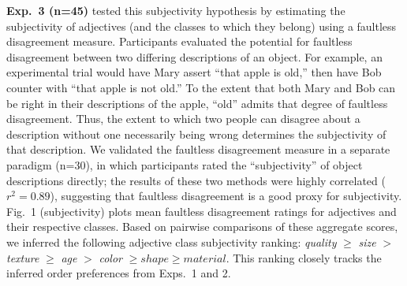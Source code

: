 \documentclass[12pt]{article}
\begin{document}
\textbf{Exp.~3 (n=45)} tested this subjectivity hypothesis  by estimating the subjectivity of adjectives (and the classes to which they belong) using a faultless disagreement measure. Participants evaluated the potential for faultless disagreement between two differing descriptions of an object. For example, an experimental trial would have Mary assert ``that apple is old,'' then have Bob counter with ``that apple is not old.'' 
To the extent that both Mary and Bob can be right in their descriptions of the apple, ``old'' admits that degree of faultless disagreement. 
Thus, the extent to which two people can disagree about a description without one necessarily being wrong determines the subjectivity of that description. 
We validated the faultless disagreement measure in a separate paradigm (n=30), in which participants rated the ``subjectivity'' of object descriptions directly; the results of these two methods were highly correlated ($r^{2} = 0.89$), suggesting that faultless disagreement is a good proxy for subjectivity.
Fig.~1 (subjectivity) plots mean faultless disagreement ratings for adjectives and their respective classes. Based on pairwise comparisons of these aggregate scores, we inferred the following adjective class subjectivity ranking: 	\emph{quality} $\geq$ \emph{size} $>$ \emph{texture} $\geq$ \emph{age} $>$ \emph{color}
	$\geq shape \geq material$.
This ranking closely tracks the inferred order preferences from Exps.~1 and 2.
\end{document}
